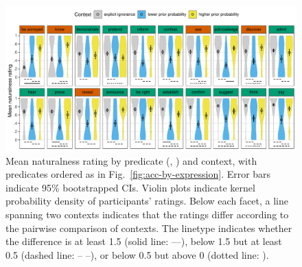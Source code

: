 \documentclass[11pt,fleqn]{article}
\newcommand{\6}{\mbox{$[\hspace*{-.6mm}[$}}
\newcommand{\9}{\mbox{$]\hspace*{-.6mm}]$}}
\begin{document}
\begin{figure}[h!]
\centering
\includegraphics[width=\textwidth]{../../results/main/graphs/naturalness-by-context-and-predicate-with-stats}
\caption{Mean naturalness rating by predicate (, ) and context, with predicates ordered as in Fig.~\ref{fig:acc-by-expression}. Error bars indicate 95\% bootstrapped CIs. Violin plots indicate kernel probability density of participants' ratings. Below each facet, a line spanning two contexts  indicates that the ratings differ according to the pairwise comparison of contexts. The linetype indicates  whether the difference is at least 1.5 (solid line: ---), below 1.5 but at least 0.5 (dashed line: -- --), or below 0.5 but above 0 (dotted line: \raisebox{1mm}{\ldots}). }\label{fig:acc-by-context}
\end{figure}
\end{document}
